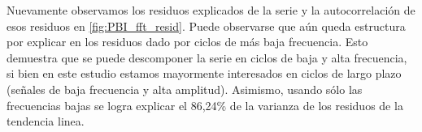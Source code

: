 \documentclass[a4paper]{article}
\begin{document}
Nuevamente observamos los residuos explicados de la serie y la autocorrelación de esos residuos en \ref{fig:PBI_fft_resid}. Puede observarse que aún queda estructura por explicar en los residuos dado por ciclos de más baja frecuencia. Esto demuestra que se puede descomponer la serie en ciclos de baja y alta frecuencia, si bien en este estudio estamos mayormente interesados en ciclos de largo plazo (señales de baja frecuencia y alta amplitud). Asimismo, usando sólo las frecuencias bajas se logra explicar el 86,24\% de la varianza de los residuos de la tendencia linea.


%
%
%
%
\end{document}
